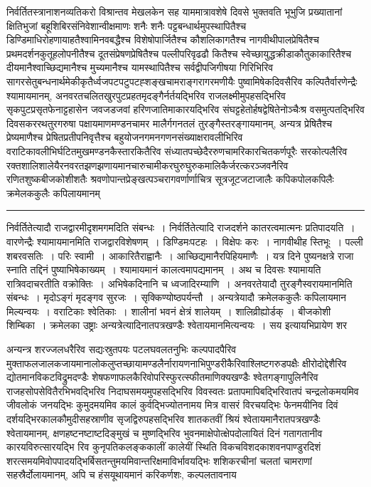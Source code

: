 \documentclass[11pt, openany]{book}
\begin{document}

\newpage
\lfoot{}

निर्वर्तितस्त्रानाशनव्यतिकरो विश्रान्तव मेखलकेन सह याममात्रावशेषे दिवसे भुक्तवति भूभुजि प्रख्यातानां क्षितिभुजां बहूशिबिरसंनिवेशान्वीक्षमाणः शनैः शनैः पट्टबन्धार्थमुपस्थापितैश्च डिण्डिमाधिरोहणायाहतैश्वामिनवबद्धैश्च विशेषोपार्जितैश्च कौशलिकागतैश्च नागवीथीपालप्रेषितैश्च प्रथमदर्शनकुतूहलोपनीतैश्च दूतसंप्रेषणप्रेषितैश्च पल्लीपरिवृढढौ कितैश्च स्वेच्छायुद्धक्रीडाकौतुकाकारितैश्च दीयमानैश्वाच्छिद्यमानैश्च मुच्यमानैश्च यामस्थापितैश्च सर्वद्वीपजिगीषया गिरिभिरिव सागरसेतुबन्धनार्थमेकीकृतैर्ध्वजपटपटुपटह्शङ्खचामराङ्गरागरमणीयैः पुष्वामिषेकदिवसैरिव कल्पितैर्वारणेन्द्रैः श्यामायमानम्, अनवरतचलितखुरपुटप्रहतमृदङ्गैर्नर्तयद्भिरिव राजलक्ष्मीमुपहसद्भिरिव सृकपुटप्रसृतफेनाट्टहासेन जवजडजवां हरिणजातिमाकारयद्भिरिव संघट्टहेतोर्हषद्वेषितेनोञ्चैःश्र वसमुत्पतद्भिरिव दिवसकररथतुरगरुषा पक्षायमाणमण्डनचामर मालैर्गगनतलं तुरङ्गैस्तरङ्गायमानम्, अन्यत्र प्रेषितैश्च प्रेष्यमाणैश्च प्रेषितप्रतीपनिवृत्तैश्च बहुयोजनगमनगणनसंख्याक्षरावलीभिरिव वराटिकावलीभिर्घटितमुखमण्डनकैस्तारकितैरिव संध्यातपच्छेदैररुणचामरिकारचितकर्णपूरैः सरकोत्पलैरिव रक्तशालिशालेयैरनवरतझणझणायमानचारुचामीकरघुरुघुरुकमालिकैर्जरत्करञ्जवनैरिव रणितशुष्कबीजकोशीशतैः श्रवणोपान्तप्रेङ्खत्पञ्चरागवर्णार्णाचित्र सूत्रजूटजटाजालैः कपिकपोलकपिलैः क्रमेलककुलैः कपिलायमानम्

\vspace{2mm}
\hrule

\noindent
{\s निर्वर्तितेत्यादौ राजद्वारमीदृशमगमदिति संबन्धः~। निर्वर्तितेत्यादि राजदर्शने कातरत्वमात्मनः प्रतिपादयति~। वारणेन्द्रैः श्यामायमानमिति राजद्वारविशेषणम्~। डिण्डिमःपटहः~। विक्षेपः करः~। नागवीथीह स्तिभूः~। पल्ली शबरवसतिः~। परिः स्वामी~। आकारितैराह्वानैः~। आच्छिद्यमानैरपिहियमाणैः~। यत्र दिने पुष्यनक्षत्रे राजा स्नाति तद्दिनं पुष्याभिषेकाख्यम्~। श्यामायमानं कालत्वमापद्यमानम्~। अथ च दिवसः श्यामायति रात्रिवदाचरतीति वक्रोक्तिः~। अभिषेकदिनानि च ध्वजादिरम्याणि~। अनवरतेयादौ तुरङ्गैस्वरायमानमिति संबन्धः~। मृदोऽङ्गं मृदङ्गव सुरजः~। सृक्किण्योष्ठपर्यन्तौ~। अन्यत्रेयादौ क्रमेलककुलैः कपिलायमान मिल्यन्वयः~। वराटिकाः श्वेतिकाः~। शालीनां भवनं क्षेत्रं शालेयम्~। {\qt शालिव्रीह्योर्डक्}~। बीजकोशी शिम्बिका~। क्रमेलका उष्ट्राः अन्यत्रेत्यादिनातपत्रखण्डैः श्वेतायमानमित्यन्वयः~। सय इत्यायभिप्रायेण शर\textendash}

\newpage

\noindent
अन्यन्त्र शरज्जलधरैरिव सद्यःस्रुतपयः पटलघवलतनुभिः कल्पपादपैरिव मुक्ताफलजालकजायमानालोकलुप्तच्छायामण्डलैर्नारायणनाभिपुण्डरीकैरिवाश्लिष्टगरुडपक्षैः क्षीरोदोद्देशैरिव द्योतमानविकटविद्रुमदण्डैः शेषफणाफलकैरिवोपरिस्फुरत्स्फीतमाणिक्यखण्डैः श्वेतगङ्गापुलिनैरिव राजहसोपसेवितैरभिभवद्भिरिव निदाघसमयमुपहसद्भिरिव विवस्वतः प्रतापमापिबद्भिरिवातपं चन्द्रलोकमयमिव जीवलोकं जनयद्भिः कुमुदमयमिव कालं कुर्वद्भिज्योतनामय मित्र वासरं विरचयद्भिः फेनमयीनिव दिवं दर्शयद्भिरकालकौमुदीसहस्राणीव सृजद्विरुपहसद्भिरिव शातकतवीं श्रियं श्वेतायमानैरातपत्रखण्डैः श्वेतायमानम्, क्षणहष्टनष्टाष्टदिङ्मुखं च मुष्णद्भिरिव भुवनमाक्षेपोत्क्षेपदोलायितं दिनं गतागतानीव कारयविरुत्सारयद्भि रिव कुनृपतिकलङ्ककालीं कालेयीं स्थिति विकचविशदकाशवनपाण्डुरदिशं शरत्समयमिवोपपादयद्भिर्बिसतन्तुमयमिवान्तरिक्षमाविर्भावयद्भिः शशिकरचीनां चलतां चामराणां सहस्रैर्दोलायमानम्, अपि च हंसयूथायमानं करिकर्णशः, कल्पलतावनाय\textendash
\end{document}
